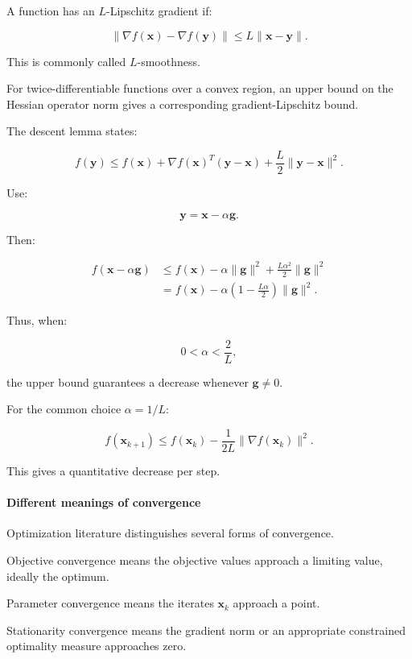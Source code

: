 A function has an \(L\)-Lipschitz gradient if:

\[
\|\nabla f(\mathbf x)-\nabla f(\mathbf y)\| \le L\|\mathbf x-\mathbf y\|.
\]

This is commonly called \(L\)-smoothness.

For twice-differentiable functions over a convex region, an upper bound on the Hessian operator norm gives a corresponding gradient-Lipschitz bound.

The descent lemma states:

\[
f(\mathbf y) \le f(\mathbf x)+ \nabla f(\mathbf x)^T(\mathbf y-\mathbf x) +\frac L2\|\mathbf y-\mathbf x\|^2.
\]

Use:

\[
\mathbf y=\mathbf x-\alpha\mathbf g.
\]

Then:

\[
\begin{aligned} f(\mathbf x-\alpha\mathbf g) &\le f(\mathbf x) -\alpha\|\mathbf g\|^2 +\frac{L\alpha^2}{2}\|\mathbf g\|^2\\ &=f(\mathbf x) -\alpha\left(1-\frac{L\alpha}{2}\right)\|\mathbf g\|^2. \end{aligned}
\]

Thus, when:

\[
0<\alpha<\frac2L,
\]

the upper bound guarantees a decrease whenever \(\mathbf g\ne0\).

For the common choice \(\alpha=1/L\):

\[
\boxed{ f(\mathbf x_{k+1}) \le f(\mathbf x_k)- \frac1{2L}\|\nabla f(\mathbf x_k)\|^2 }.
\]

This gives a quantitative decrease per step.

\paragraph{Different meanings of convergence}\label{02-foundations-ii-ch026-different-meanings-of-convergence}

\hypertarget{02-foundations-ii-ch026-different-meanings-of-convergence}{}

Optimization literature distinguishes several forms of convergence.

Objective convergence means the objective values approach a limiting value, ideally the optimum.

Parameter convergence means the iterates \(\mathbf x_k\) approach a point.

Stationarity convergence means the gradient norm or an appropriate constrained optimality measure approaches zero.


